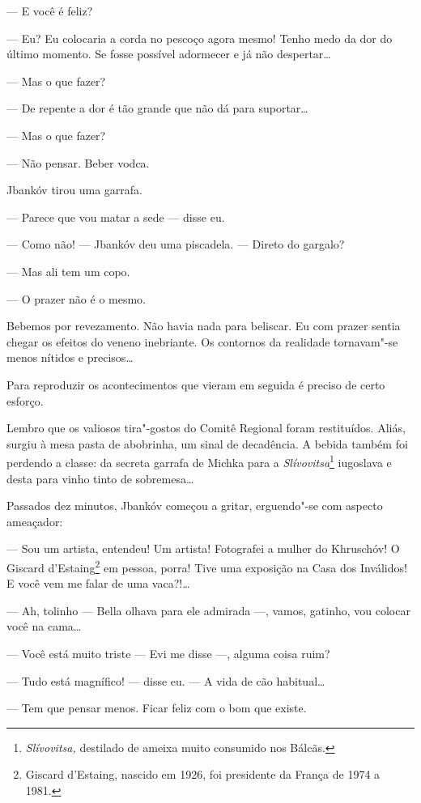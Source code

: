 --- E você é feliz?

--- Eu? Eu colocaria a corda no pescoço agora mesmo! Tenho medo \label{ref01}
da dor do último momento. Se fosse possível adormecer e já não
despertar\ldots{}

--- Mas o que fazer?

--- De repente a dor é tão grande que não dá para suportar\ldots{}

--- Mas o que fazer?

--- Não pensar. Beber vodca.

Jbankóv tirou uma garrafa.

--- Parece que vou matar a sede --- disse eu.

--- Como não! --- Jbankóv deu uma piscadela. ---
Direto do gargalo?

--- Mas ali tem um copo.

--- O prazer não é o mesmo.

Bebemos por revezamento. Não havia nada para beliscar. Eu com prazer
sentia chegar os efeitos do veneno inebriante. Os contornos da realidade
tornavam"-se menos nítidos e precisos\ldots{}

Para reproduzir os acontecimentos que vieram em seguida é preciso de
certo esforço.

Lembro que os valiosos tira"-gostos do Comitê Regional foram restituídos.
Aliás, surgiu à mesa pasta de abobrinha, um sinal de decadência. A
bebida também foi perdendo a classe: da secreta garrafa de Michka para a
\emph{Slívovitsa}\footnote{\emph{Slívovitsa,} destilado de ameixa muito
  consumido nos Bálcãs.} iugoslava e desta para vinho tinto de
sobremesa\ldots{}

Passados dez minutos, Jbankóv começou a gritar, erguendo"-se com aspecto
ameaçador:

--- Sou um artista, entendeu! Um artista! Fotografei a mulher do
Khruschóv! O Giscard d'Estaing\footnote{Giscard d'Estaing, nascido em
  1926, foi presidente da França de 1974 a 1981.} em pessoa, porra! Tive
uma exposição na Casa dos Inválidos! E você vem me falar de uma
vaca?!\ldots{}

--- Ah, tolinho --- Bella olhava para ele admirada
---, vamos, gatinho, vou colocar você na cama\ldots{}

--- Você está muito triste --- Evi me disse ---,
alguma coisa ruim?

--- Tudo está magnífico! --- disse eu. --- A vida
de cão habitual\ldots{}

--- Tem que pensar menos. Ficar feliz com o bom que existe.

